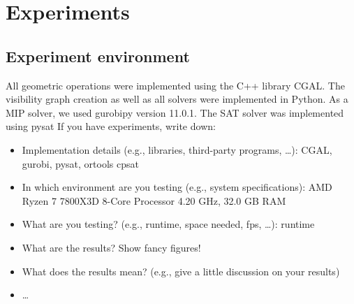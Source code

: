 \chapter{Experiments}
\section{Experiment environment}
All geometric operations were implemented using the C++ library CGAL. The visibility graph creation as well as all solvers were implemented in Python. As a MIP solver, we used gurobipy version 11.0.1. The SAT solver was implemented using pysat 
If you have experiments, write down:
\begin{itemize}
	\item Implementation details (e.g., libraries, third-party programs, \dots): CGAL, gurobi, pysat, ortools cpsat
	\item In which environment are you testing (e.g., system specifications): AMD Ryzen 7 7800X3D 8-Core Processor 4.20 GHz, 32.0 GB RAM
	\item What are you testing? (e.g., runtime, space needed, fps, \dots): runtime
	\item What are the results? Show fancy figures!
	\item What does the results mean? (e.g., give a little discussion on your results)
	\item \dots
\end{itemize}